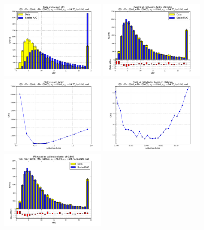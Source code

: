 
 \begin{figure}[htbp] \begin{center} 
\includegraphics[width=0.45\textwidth]{../FIGURES/165/FIG_Data_and_scaled_MC.pdf} 
\includegraphics[width=0.45\textwidth]{../FIGURES/165/FIG_Best_fit_at_calibration_factor_of_0_600.pdf} 
\includegraphics[width=0.45\textwidth]{../FIGURES/165/FIG_Chi2_vs_calib_factor.pdf} 
\includegraphics[width=0.45\textwidth]{../FIGURES/165/FIG_Chi2_vs_calib_factor_Zoom_on_chi2min.pdf} 
\includegraphics[width=0.45\textwidth]{../FIGURES/165/FIG_Fit_result_for_calibration_factor_of_0_592.pdf} 

\end{center}
\end{figure}
